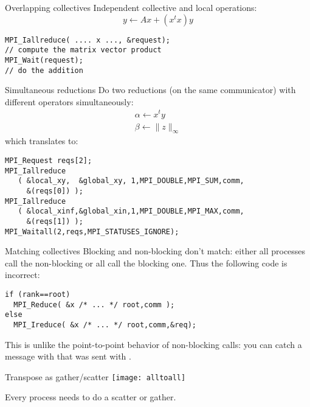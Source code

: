 \begin{numberedframe}{Overlapping collectives}
  \label{sl:coll-nonblock-overlap}
  Independent collective and local operations:
\[ y \leftarrow Ax + (x^tx)y \]
\begin{lstlisting}
MPI_Iallreduce( .... x ..., &request);
// compute the matrix vector product
MPI_Wait(request);
// do the addition
\end{lstlisting}
\end{numberedframe}

\begin{numberedframe}{Simultaneous reductions}
  \label{sl:coll-nonblock-simult}
  Do two reductions (on the same communicator) with different
  operators simultaneously:
  \[ 
  \begin{array}{l}
    \alpha\leftarrow x^ty\\
    \beta\leftarrow \|z\|_\infty
  \end{array}
  \]
which translates to:
\begin{lstlisting}
MPI_Request reqs[2];
MPI_Iallreduce
   ( &local_xy,  &global_xy, 1,MPI_DOUBLE,MPI_SUM,comm,
     &(reqs[0]) );
MPI_Iallreduce
   ( &local_xinf,&global_xin,1,MPI_DOUBLE,MPI_MAX,comm,
     &(reqs[1]) );
MPI_Waitall(2,reqs,MPI_STATUSES_IGNORE);
\end{lstlisting}
\end{numberedframe}



\begin{numberedframe}{Matching collectives}
  \label{sl:coll-nonblock-match}
  Blocking and non-blocking don't match: either all processes
  call the non-blocking or all call the blocking one.
  Thus the following code is incorrect:
\begin{lstlisting}
if (rank==root)
  MPI_Reduce( &x /* ... */ root,comm );
else
  MPI_Ireduce( &x /* ... */ root,comm,&req);
\end{lstlisting}
  This is unlike the point-to-point behavior of non-blocking calls:
  you can catch a message with 
  that was sent with .
\end{numberedframe}

\begin{numberedframe}{Transpose as gather/scatter}
  \texttt{[image: alltoall]}

  Every process needs to do a scatter or gather.
\end{numberedframe}

